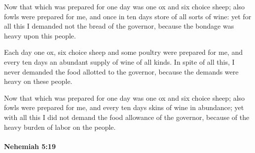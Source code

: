 			\begin{versebox}
					\item[BHS] 
					\item[LXX] 
					\item[ASV] Now that which was prepared for one day was one ox and six choice sheep; also fowls were prepared for me, and once in ten days store of all sorts of wine: yet for all this I demanded not the bread of the governor, because the bondage was heavy upon this people.
					\item[NIV] Each day one ox, six choice sheep and some poultry were prepared for me, and every ten days an abundant supply of wine of all kinds. In spite of all this, I never demanded the food allotted to the governor, because the demands were heavy on these people.
					\item[NRSV] Now that which was prepared for one day was one ox and six choice sheep; also fowls were prepared for me, and every ten days skins of wine in abundance; yet with all this I did not demand the food allowance of the governor, because of the heavy burden of labor on the people.
			\end{versebox}

		\paragraph{Nehemiah 5:19} %
			\label{NEHEMIAH-5-19}

